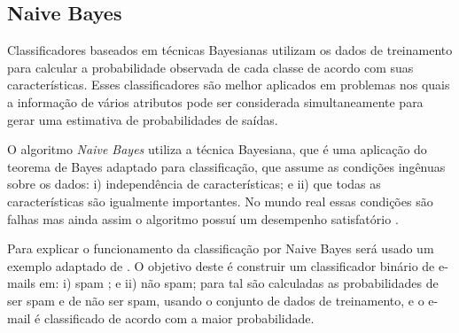 \subsection{Naive Bayes}
Classificadores baseados em técnicas Bayesianas utilizam os dados de treinamento para calcular a probabilidade observada de cada classe de acordo com suas características. Esses classificadores são melhor aplicados em problemas nos quais a informação de vários atributos pode ser considerada simultaneamente para gerar uma estimativa de probabilidades de saídas.

O algoritmo \emph{Naive Bayes} utiliza a técnica Bayesiana, que é uma aplicação do teorema de Bayes adaptado para classificação, que assume as condições ingênuas sobre os dados: i) independência de características; e ii) que todas as características são igualmente importantes. No mundo real essas condições são falhas mas ainda assim o algoritmo possuí um desempenho satisfatório \cite{HanKamber2011}.

Para explicar o funcionamento da classificação por Naive Bayes será usado um exemplo adaptado de . O objetivo deste é construir um classificador binário de e-mails em: i) spam ; e ii) não spam; para tal são calculadas as probabilidades de ser spam e de não ser spam, usando o conjunto de dados de treinamento, e o e-mail é classificado de acordo com a maior probabilidade. 

